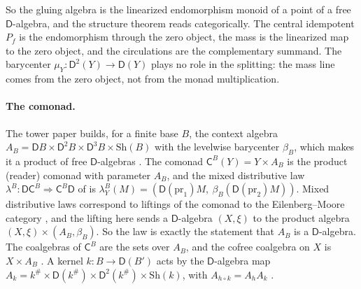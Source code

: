 \documentclass[11pt]{article}
\theoremstyle{definition}
\theoremstyle{remark}
\newcommand{\D}{\mathsf{D}}
\newcommand{\C}{\mathsf C}
\newcommand{\Sh}{\mathrm{Sh}}
\begin{document}
So the gluing algebra is the linearized endomorphism monoid of a point of a free $\D$-algebra, and the structure theorem
reads categorically. The central idempotent $P_f$ is the endomorphism through the zero object, the mass is the
linearized map to the zero object, and the circulations are the complementary summand. The barycenter
$\mu_Y\colon\D^2(Y)\to\D(Y)$ plays no role in the splitting: the mass line comes from the zero object, not from the monad
multiplication.

\paragraph{The comonad.} The tower paper builds, for a finite base $B$, the context algebra $A_B=\D B\times\D^2B\times\D^3B\times\Sh(B)$
with the levelwise barycenter $\beta_B$, which makes it a product of free $\D$-algebras \cite[\S9]{Tower}. The comonad
$\C^B(Y)=Y\times A_B$ is the product (reader) comonad with parameter $A_B$, and the mixed distributive law
$\lambda^B\colon\D\C^B\Rightarrow\C^B\D$ of \cite[Thm.~9.8]{Tower} is $\lambda^B_Y(M)=(\D(\mathrm{pr}_1)M,\ \beta_B(\D(\mathrm{pr}_2)M))$. Mixed distributive
laws correspond to liftings of the comonad to the Eilenberg--Moore category \cite{PowerWatanabe2002}, and the lifting here sends a
$\D$-algebra $(X,\xi)$ to the product algebra $(X,\xi)\times(A_B,\beta_B)$. So the law is exactly the statement that $A_B$ is a
$\D$-algebra. The coalgebras of $\C^B$ are the sets over $A_B$, and the cofree coalgebra on $X$ is $X\times A_B$
\cite[Props.~13.1, 13.2]{Tower}. A kernel $k\colon B\to\D(B')$ acts by the $\D$-algebra map
$A_k=k^\#\times\D(k^\#)\times\D^2(k^\#)\times\Sh(k)$, with $A_{h\circ k}=A_hA_k$ \cite[Prop.~9.14]{Tower}.
\end{document}
